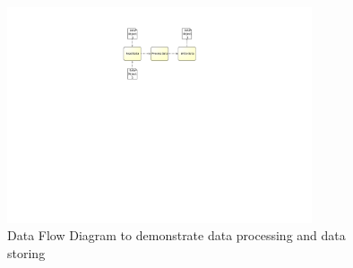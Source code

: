 \begin{figure}[h!]
	\centering
	\includegraphics[width=9cm, trim={10cm 14.3cm 10cm 2.2cm}]{img/ProcessDataDFD.pdf}
	\caption{Data Flow Diagram to demonstrate data processing and data storing}
	\label{fig:ExampleDataProcessing}
\end{figure}

